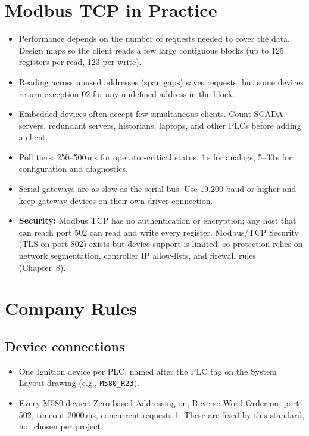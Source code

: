 \section{Modbus TCP in Practice}
\begin{itemize}[itemsep=2pt]
  \item Performance depends on the number of requests needed to cover the data. Design maps so the client reads a few large contiguous blocks (up to 125 registers per read, 123 per write).
  \item Reading across unused addresses (span gaps) saves requests, but some devices return exception 02 for any undefined address in the block.
  \item Embedded devices often accept few simultaneous clients. Count SCADA servers, redundant servers, historians, laptops, and other PLCs before adding a client.
  \item Poll tiers: 250--500\,ms for operator-critical status, 1\,s for analogs, 5--30\,s for configuration and diagnostics.
  \item Serial gateways are as slow as the serial bus. Use 19{,}200 baud or higher and keep gateway devices on their own driver connection.
  \item \textbf{Security:} Modbus TCP has no authentication or encryption; any host that can reach port 502 can read and write every register. Modbus/TCP Security (TLS on port 802) exists but device support is limited, so protection relies on network segmentation, controller IP allow-lists, and firewall rules (Chapter~8).
\end{itemize}

\section{Company Rules}
\label{app:modbus:rules}
\subsection*{Device connections}
\begin{itemize}[itemsep=2pt]
  \item One Ignition device per PLC, named after the PLC tag on the System Layout drawing (e.g., \texttt{M580\_R23}).
  \item Every M580 device: Zero-based Addressing on, Reverse Word Order on, port 502, timeout 2000\,ms, concurrent requests 1. These are fixed by this standard, not chosen per project.
\end{itemize}

